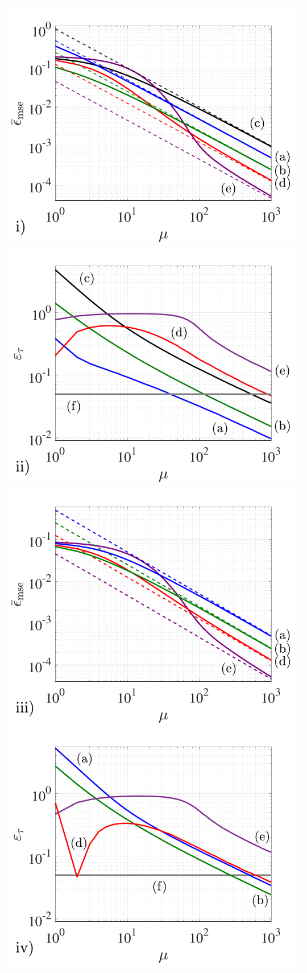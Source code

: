 \begin{figure}[t]
\centering
\includegraphics[trim={0.1cm 0.1cm 0.5cm 0.5cm},clip,width=7.7cm]{pictures/ch4_fig3i}\includegraphics[trim={0.1cm 0.1cm 0.5cm 0.5cm},clip,width=7.7cm]{pictures/ch4_fig3ii} 
\includegraphics[trim={0.1cm 0.1cm 0.5cm 0.5cm},clip,width=7.7cm]{pictures/ch4_fig3iii}\includegraphics[trim={0.1cm 0.1cm 0.5cm 0.5cm},clip,width=7.7cm]{pictures/ch4_fig3iv}

\end{figure}
